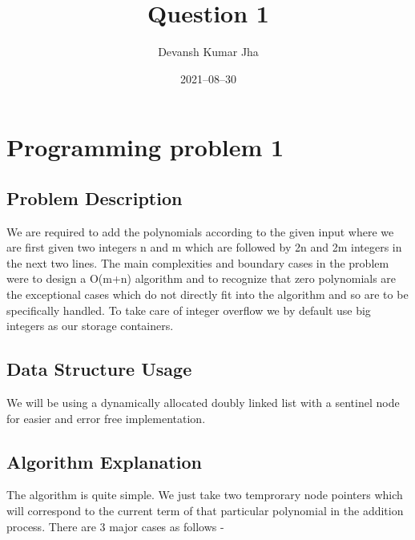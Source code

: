\documentclass[20pt]{article}
\title{Question 1}
\author{Devansh Kumar Jha}
\date{2021–08–30}
\begin{document}
\maketitle

\section{Programming problem 1}

\subsection{Problem Description}
We are required to add the polynomials according to the given input where we are first given two integers n and m which are followed by {2n} and {2m} integers in the next two lines.
The main complexities and boundary cases in the problem were to design a {O(m+n)} algorithm and to recognize that zero polynomials are the exceptional cases which do not directly fit into the algorithm and so are to be specifically handled. To take care of integer overflow we by default use big integers as our storage containers.

\subsection{Data Structure Usage}
We will be using a dynamically allocated doubly linked list with a sentinel node for easier and error free implementation.

\subsection{Algorithm Explanation}
The algorithm is quite simple. We just take two temprorary node pointers which will correspond to the current term of that particular polynomial in the addition process. There are 3 major cases as follows -
\end{document}
